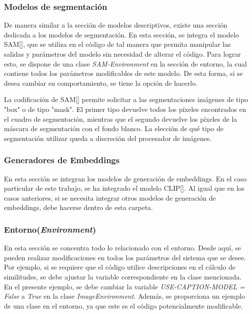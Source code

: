 \subsubsection{Modelos de segmentaci\'on}
De manera similar a la sección de modelos descriptivos, existe una sección dedicada a los modelos de segmentación. En esta sección, se integra el modelo SAM[\cite{huggingface2022sam}], que se utiliza en el código de tal manera que permita manipular las salidas y par\'ametros del modelo sin necesidad de alterar el código. Para lograr esto, se dispone de una clase \textit{SAM-Environment} en la sección de entorno, la cual contiene todos los par\'ametros modificables de este modelo. De esta forma, si se desea cambiar su comportamiento, se tiene la opción de hacerlo.

La codificación de SAM[\cite{huggingface2022sam}] permite solicitar a las segmentaciones im\'agenes de tipo "box" o de tipo "mask". El primer tipo devuelve todos los píxeles encontrados en el cuadro de segmentación, mientras que el segundo devuelve los píxeles de la m\'ascara de segmentación con el fondo blanco. La elección de qué tipo de segmentación utilizar queda a discreción del procesador de im\'agenes.

\subsubsection{Generadores de Embeddings}
En esta sección se integran los modelos de generación de embeddings. En el caso particular de este trabajo, se ha integrado el modelo CLIP[\cite{git-clip}]. Al igual que en los casos anteriores, si se necesita integrar otros modelos de generación de embeddings, debe hacerse dentro de esta carpeta.

\subsubsection{Entorno(\textit{Environment})}
En esta sección se concentra todo lo relacionado con el entorno. Desde aquí, se pueden realizar modificaciones en todos los par\'ametros del sistema que se desee. Por ejemplo, si se requiere que el código utilice descripciones en el c\'alculo de similitudes, se debe ajustar la variable correspondiente en la clase mencionada. En el presente ejemplo, se debe cambiar la variable \textit{USE-CAPTION-MODEL = False} a \textit{True} en la clase \textit{ImageEnvironment}. Adem\'as, se proporciona un ejemplo de una clase en el entorno, ya que este es el código potencialmente modificable.

